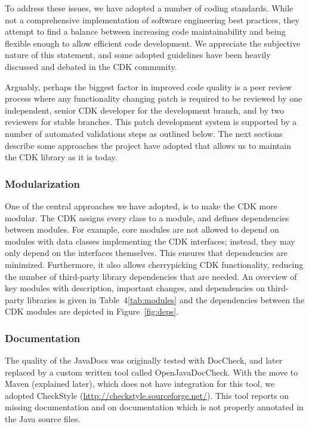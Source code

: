 \documentclass[doublespacing]{bmcart}
\begin{document}
To address these issues, we have adopted a number of coding
standards. While not a comprehensive implementation of software
engineering best practices, they attempt to find a balance between
increasing code maintainability and being flexible enough to allow
efficient code development. We appreciate the subjective
nature of this statement, and some adopted guidelines have been
heavily discussed and debated in the CDK community.

Arguably, perhaps the biggest factor in improved code quality is a
peer review process where any functionality changing patch is required
to be reviewed by one independent, senior CDK developer for the
development branch, and by two reviewers for stable branches. This patch
development system is supported by a number of automated validations
steps as outlined below.
The next sections describe some approaches the project have adopted that allows
us to maintain the CDK library as it is today. 

\subsubsection*{Modularization}

One of the central approaches we have adopted, is to make the CDK more modular. The CDK assigns
every class to a module, and defines dependencies between modules. For example, core modules
are not allowed to depend on modules with data classes implementing the CDK interfaces;
instead, they may only depend on the interfaces themselves. This ensures that
dependencies are minimized. Furthermore, it also allows cherrypicking CDK
functionality, reducing the number of third-party library dependencies that are
needed.
An overview of key modules with description, important changes, and dependencies
on third-party libraries is given in Table~4\ref{tab:modules} and the dependencies
between the CDK modules are depicted in
Figure~\ref{fig:deps}.


\subsubsection*{Documentation}

The quality of the JavaDocs was originally tested with DocCheck, and
later replaced by a custom written tool called OpenJavaDocCheck. With the move
to Maven (explained later), which does not have integration for this tool,
we adopted CheckStyle (\url{http://checkstyle.sourceforge.net/}). This tool
reports on missing documentation and on documentation which is not properly
annotated in the Java source files.
\end{document}
